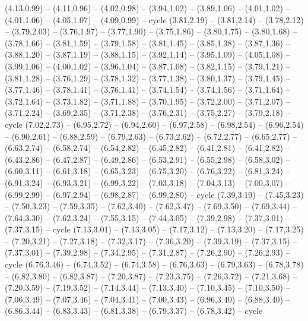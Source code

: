 \expandafter\def\csname geo:gebiet:CHL\endcsname{
  (4.13,0.99) -- (4.11,0.96) -- (4.02,0.98) -- (3.94,1.02) -- (3.89,1.06) -- (4.01,1.02) -- (4.01,1.06) -- (4.05,1.07) -- (4.09,0.99) -- cycle
  (3.81,2.19) -- (3.81,2.14) -- (3.78,2.12) -- (3.79,2.03) -- (3.76,1.97) -- (3.77,1.90) -- (3.75,1.86) -- (3.80,1.75) -- (3.80,1.68) -- (3.78,1.66) -- (3.81,1.59) -- (3.79,1.58) -- (3.81,1.45) -- (3.85,1.38) -- (3.87,1.36) -- (3.88,1.20) -- (3.87,1.19) -- (3.88,1.15) -- (3.92,1.14) -- (3.95,1.09) -- (4.05,1.08) -- (3.99,1.06) -- (4.00,1.02) -- (3.96,1.04) -- (3.87,1.08) -- (3.82,1.15) -- (3.79,1.21) -- (3.81,1.28) -- (3.76,1.29) -- (3.78,1.32) -- (3.77,1.38) -- (3.80,1.37) -- (3.79,1.45) -- (3.77,1.46) -- (3.78,1.41) -- (3.76,1.41) -- (3.74,1.54) -- (3.74,1.56) -- (3.71,1.64) -- (3.72,1.64) -- (3.73,1.82) -- (3.71,1.88) -- (3.70,1.95) -- (3.72,2.00) -- (3.71,2.07) -- (3.71,2.24) -- (3.69,2.35) -- (3.71,2.38) -- (3.76,2.31) -- (3.75,2.27) -- (3.79,2.18) -- cycle}
\expandafter\def\csname geo:gebiet:COD\endcsname{
  (7.02,2.73) -- (6.95,2.72) -- (6.94,2.60) -- (6.97,2.58) -- (6.98,2.54) -- (6.96,2.54) -- (6.90,2.61) -- (6.88,2.59) -- (6.79,2.63) -- (6.73,2.62) -- (6.72,2.77) -- (6.65,2.77) -- (6.63,2.74) -- (6.58,2.74) -- (6.54,2.82) -- (6.45,2.82) -- (6.41,2.81) -- (6.41,2.82) -- (6.43,2.86) -- (6.47,2.87) -- (6.49,2.86) -- (6.53,2.91) -- (6.55,2.98) -- (6.58,3.02) -- (6.60,3.11) -- (6.61,3.18) -- (6.65,3.23) -- (6.75,3.20) -- (6.76,3.22) -- (6.81,3.24) -- (6.91,3.24) -- (6.93,3.21) -- (6.99,3.22) -- (7.03,3.18) -- (7.04,3.13) -- (7.00,3.07) -- (6.99,2.99) -- (6.97,2.94) -- (6.98,2.87) -- (6.99,2.80) -- cycle}
\expandafter\def\csname geo:gebiet:SOM\endcsname{
  (7.39,3.19) -- (7.45,3.23) -- (7.50,3.23) -- (7.59,3.35) -- (7.62,3.40) -- (7.62,3.47) -- (7.69,3.50) -- (7.69,3.44) -- (7.64,3.30) -- (7.62,3.24) -- (7.55,3.15) -- (7.44,3.05) -- (7.39,2.98) -- (7.37,3.01) -- (7.37,3.15) -- cycle}
\expandafter\def\csname geo:gebiet:KEN\endcsname{
  (7.13,3.01) -- (7.13,3.05) -- (7.17,3.12) -- (7.13,3.20) -- (7.17,3.25) -- (7.20,3.21) -- (7.27,3.18) -- (7.32,3.17) -- (7.36,3.20) -- (7.39,3.19) -- (7.37,3.15) -- (7.37,3.01) -- (7.39,2.98) -- (7.34,2.95) -- (7.31,2.87) -- (7.26,2.90) -- (7.26,2.93) -- cycle}
\expandafter\def\csname geo:gebiet:SDN\endcsname{
  (6.76,3.46) -- (6.74,3.52) -- (6.74,3.58) -- (6.76,3.63) -- (6.79,3.63) -- (6.78,3.78) -- (6.82,3.80) -- (6.82,3.87) -- (7.20,3.87) -- (7.23,3.75) -- (7.26,3.72) -- (7.21,3.68) -- (7.20,3.59) -- (7.19,3.52) -- (7.14,3.44) -- (7.13,3.40) -- (7.10,3.45) -- (7.10,3.50) -- (7.06,3.49) -- (7.07,3.46) -- (7.04,3.41) -- (7.00,3.43) -- (6.96,3.40) -- (6.88,3.40) -- (6.86,3.44) -- (6.83,3.43) -- (6.81,3.38) -- (6.79,3.37) -- (6.78,3.42) -- cycle}
